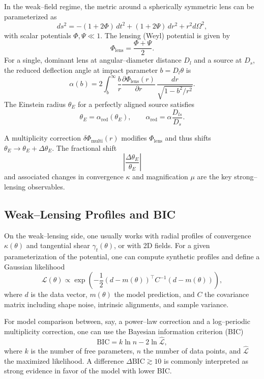 \documentclass[11pt]{article}
\begin{document}
In the weak--field regime, the metric around a spherically symmetric lens can be parameterized as
\begin{equation}
  ds^2 = -(1+2\Phi)\,dt^2 + (1+2\Psi)\,dr^2 + r^2 d\Omega^2,
\end{equation}
with scalar potentials $\Phi,\Psi \ll 1$. The lensing (Weyl) potential is given by
\begin{equation}
  \Phi_{\text{lens}} = \frac{\Phi + \Psi}{2}.
\end{equation}
For a single, dominant lens at angular--diameter distance $D_l$ and a source at $D_s$, the reduced deflection angle at impact parameter $b = D_l\theta$ is
\begin{equation}
  \alpha(b)
  = 2 \int_{b}^{\infty} \frac{b}{r}
  \frac{\partial \Phi_{\text{lens}}(r)}{\partial r}\,
  \frac{dr}{\sqrt{1 - b^2/r^2}}.
\end{equation}
The Einstein radius $\theta_E$ for a perfectly aligned source satisfies
\begin{equation}
  \theta_E = \alpha_{\text{red}}(\theta_E),
  \qquad \alpha_{\text{red}} = \alpha \frac{D_{ls}}{D_s}.
\end{equation}

A multiplicity correction $\delta\Phi_{\text{multi}}(r)$ modifies $\Phi_{\text{lens}}$ and thus shifts $\theta_E \to \theta_E + \Delta\theta_E$. The fractional shift
\[
\left|\frac{\Delta\theta_E}{\theta_E}\right|
\]
and associated changes in convergence $\kappa$ and magnification $\mu$ are the key strong--lensing observables.

\subsection{Weak--Lensing Profiles and BIC}

On the weak--lensing side, one usually works with radial profiles of convergence $\kappa(\theta)$ and tangential shear $\gamma_t(\theta)$, or with 2D fields. For a given parameterization of the potential, one can compute synthetic profiles and define a Gaussian likelihood
\begin{equation}
  \mathcal{L}(\theta) \propto
  \exp\left(
    -\frac{1}{2} (d - m(\theta))^\top C^{-1} (d - m(\theta))
  \right),
\end{equation}
where $d$ is the data vector, $m(\theta)$ the model prediction, and $C$ the covariance matrix including shape noise, intrinsic alignments, and sample variance.

For model comparison between, say, a power--law correction and a log--periodic multiplicity correction, one can use the Bayesian information criterion (BIC)
\begin{equation}
  \mathrm{BIC} = k \ln n - 2\ln\hat{\mathcal{L}},
\end{equation}
where $k$ is the number of free parameters, $n$ the number of data points, and $\hat{\mathcal{L}}$ the maximized likelihood. A difference $\Delta\mathrm{BIC} \gtrsim 10$ is commonly interpreted as strong evidence in favor of the model with lower BIC.
\end{document}
